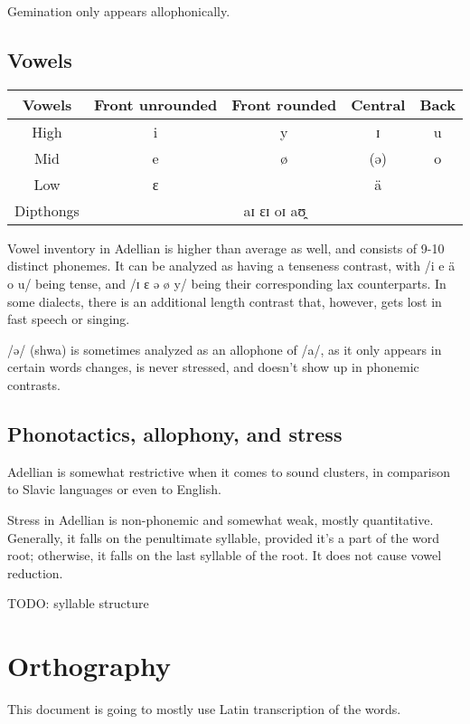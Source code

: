 \documentclass[12pt]{article}
\begin{document}
	Gemination only appears allophonically.

	\subsection{Vowels}

	\begin{tabular}{|| c | c c c c || }
		\hline
		Vowels & Front unrounded & Front rounded & Central & Back \\
		\hline
		High & i & y & ɪ & u \\
		Mid & e & ø & (ə) & o \\
		Low & ɛ & & ä & \\
		Dipthongs & \multicolumn{4}{c||}{aɪ ɛɪ oɪ aʊ̯} \\
		\hline
	\end{tabular}

	Vowel inventory in Adellian is higher than average as well, and consists of 9-10 distinct phonemes. It can be analyzed as having a tenseness contrast, with /i e ä o u/ being tense, and /ɪ ɛ ə ø y/ being their corresponding lax counterparts. In some dialects, there is an additional length contrast that, however, gets lost in fast speech or singing.

	/ə/ (shwa) is sometimes analyzed as an allophone of /a/, as it only appears in certain words changes, is never stressed, and doesn't show up in phonemic contrasts.

	\subsection{Phonotactics, allophony, and stress}

	Adellian is somewhat restrictive when it comes to sound clusters, in comparison to Slavic languages or even to English.

	Stress in Adellian is non-phonemic and somewhat weak, mostly quantitative. Generally, it falls on the penultimate syllable, provided it's a part of the word root; otherwise, it falls on the last syllable of the root. It does not cause vowel reduction.

	TODO: syllable structure

	\section{Orthography}

	This document is going to mostly use Latin transcription of the words. 
\end{document}
